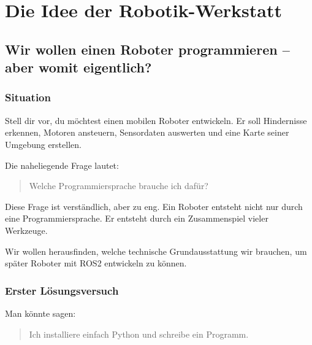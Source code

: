 \part{Die Idee der Robotik-Werkstatt}

\chapter{Wir wollen einen Roboter programmieren -- aber womit eigentlich?}

\kapitelstruktur


\section{Situation}

Stell dir vor, du möchtest einen mobilen Roboter entwickeln. Er soll Hindernisse
erkennen, Motoren ansteuern, Sensordaten auswerten und eine Karte seiner
Umgebung erstellen.

Die naheliegende Frage lautet:

\begin{quote}
Welche Programmiersprache brauche ich dafür?
\end{quote}

Diese Frage ist verständlich, aber zu eng. Ein Roboter entsteht nicht nur durch
eine Programmiersprache. Er entsteht durch ein Zusammenspiel vieler Werkzeuge.

\begin{aufgabeBox}
Wir wollen herausfinden, welche technische Grundausstattung wir brauchen,
um später Roboter mit ROS2 entwickeln zu können.
\end{aufgabeBox}

\section{Erster Lösungsversuch}

Man könnte sagen:

\begin{quote}
Ich installiere einfach Python und schreibe ein Programm.
\end{quote}

